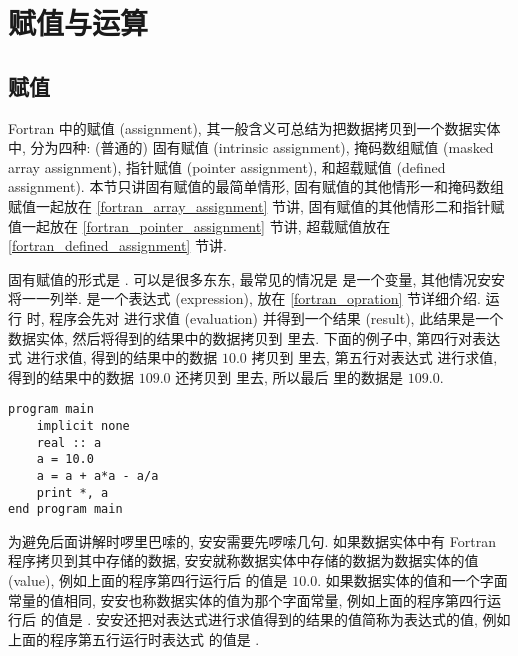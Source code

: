 \chapter{赋值与运算}

\section{赋值}\label{fortran_assignment}

Fortran 中的赋值 (assignment), 其一般含义可总结为把数据拷贝到一个数据实体中, 分为四种: (普通的) 固有赋值 (intrinsic assignment), 掩码数组赋值 (masked array assignment), 指针赋值 (pointer assignment), 和超载赋值 (defined assignment). 本节只讲固有赋值的最简单情形, 固有赋值的其他情形一和掩码数组赋值一起放在 \ref{fortran_array_assignment} 节讲, 固有赋值的其他情形二和指针赋值一起放在 \ref{fortran_pointer_assignment} 节讲, 超载赋值放在 \ref{fortran_defined_assignment} 节讲.

固有赋值的形式是 \ttt{[var] = [expr]}. \ttt{[var]} 可以是很多东东, 最常见的情况是 \ttt{[var]} 是一个变量, 其他情况安安将一一列举. \ttt{[expr]} 是一个表达式 (expression), 放在 \ref{fortran_opration} 节详细介绍. 运行 \ttt{[var] = [expr]} 时, 程序会先对 \ttt{[expr]} 进行求值 (evaluation) 并得到一个结果 (result), 此结果是一个数据实体, 然后将得到的结果中的数据拷贝到 \ttt{[var]} 里去. 下面的例子中, 第四行对表达式  进行求值, 得到的结果中的数据 $10.0$ 拷贝到  里去, 第五行对表达式  进行求值, 得到的结果中的数据 $109.0$ 还拷贝到  里去, 所以最后  里的数据是 $109.0$.
\begin{lstlisting}
program main
    implicit none
    real :: a
    a = 10.0
    a = a + a*a - a/a
    print *, a
end program main
\end{lstlisting}

为避免后面讲解时啰里巴嗦的, 安安需要先啰嗦几句. 如果数据实体中有 Fortran 程序拷贝到其中存储的数据, 安安就称数据实体中存储的数据为数据实体的值 (value), 例如上面的程序第四行运行后  的值是 $10.0$. 如果数据实体的值和一个字面常量的值相同, 安安也称数据实体的值为那个字面常量, 例如上面的程序第四行运行后  的值是 . 安安还把对表达式进行求值得到的结果的值简称为表达式的值, 例如上面的程序第五行运行时表达式  的值是 .

